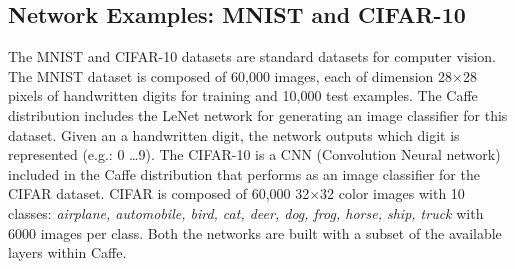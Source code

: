 \subsection{Network Examples: MNIST and CIFAR-10}
The MNIST \cite{Deng2012, MNIST} and CIFAR-10 \cite{CIFAR10} datasets are standard datasets for 
computer vision. The MNIST dataset is composed of 60,000 images, each of dimension 28$\times$28 pixels 
of handwritten digits for training and 10,000 test examples. 
The Caffe distribution includes the LeNet \cite{LeNet} network for generating an image 
classifier for this dataset. Given an a handwritten digit, 
the network outputs which digit is represented (e.g.: 0 \dots 9). 
The CIFAR-10 is a CNN (Convolution Neural network) \cite{CNN} included in the Caffe distribution
that performs as an image classifier for the CIFAR dataset. CIFAR is 
composed of 60,000 32$\times$32 color images with 10 classes: 
\emph{airplane, automobile, bird, cat, deer, dog, frog, horse, ship, 
truck} with 6000 images per class. Both the networks are built with  
a subset of the available layers within Caffe. 


